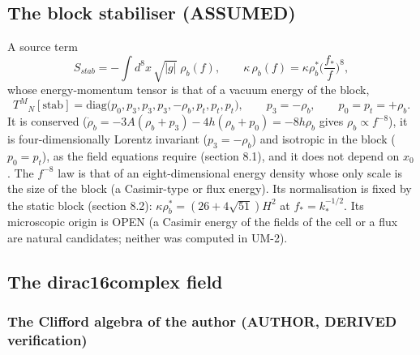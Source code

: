 \documentclass[
  10pt,
]{article}
\begin{document}
\hypertarget{the-block-stabiliser-assumed}{%
\subsection{The block stabiliser
(ASSUMED)}\label{the-block-stabiliser-assumed}}

A source term
\[ S_{stab} = -\int d^8x\,\sqrt{|g|}\;\rho_b(f), \qquad \kappa\,\rho_b(f) = \kappa\rho_b^*\Big(\frac{f_*}{f}\Big)^{8} ,\]
whose energy-momentum tensor is that of a vacuum energy of the block,
\[ T^M{}_N[\text{stab}] = \mathrm{diag}\big(p_0, p_3, p_3, p_3, -\rho_b, p_t, p_t, p_t\big), \qquad p_3 = -\rho_b, \qquad p_0 = p_t = +\rho_b .\]
It is conserved
(\(\dot\rho_b = -3A(\rho_b + p_3) - 4h(\rho_b + p_0) = -8h\rho_b\) gives
\(\rho_b \propto f^{-8}\)), it is four-dimensionally Lorentz invariant
(\(p_3 = -\rho_b\)) and isotropic in the block (\(p_0 = p_t\)), as the
field equations require (section 8.1), and it does not depend on
\(x_0\). The \(f^{-8}\) law is that of an eight-dimensional energy
density whose only scale is the size of the block (a Casimir-type or
flux energy). Its normalisation is fixed by the static block (section
8.2): \(\kappa\rho_b^* = (26 + 4\sqrt{51})H^2\) at \(f_* = k_*^{-1/2}\).
Its microscopic origin is OPEN (a Casimir energy of the fields of the
cell or a flux are natural candidates; neither was computed in UM-2).

\hypertarget{the-dirac16complex-field}{%
\subsection{The dirac16complex field}\label{the-dirac16complex-field}}

\hypertarget{the-clifford-algebra-of-the-author-author-derived-verification}{%
\subsubsection{The Clifford algebra of the author (AUTHOR, DERIVED
verification)}\label{the-clifford-algebra-of-the-author-author-derived-verification}}
\end{document}
